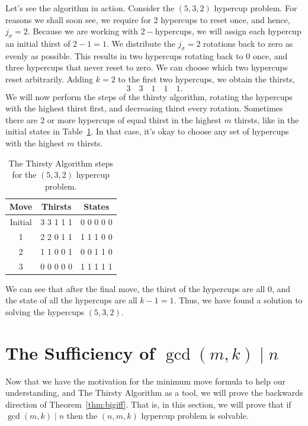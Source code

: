 \documentclass{article}
\theoremstyle{theorem}
\theoremstyle{definition}
\begin{document}
Let's see the algorithm in action. Consider the $(5,3,2)$ hypercup problem. For reasons we shall soon see, we require for 2 hypercups to reset once, and hence, $j_\sigma=2$. Because we are working with $2-$hypercups, we will assign each hypercup an initial thirst of $2-1=1.$ We distribute the $j_\sigma=2$ rotations back to zero as evenly as possible. This results in two hypercups rotating back to $0$ once, and three hypercups that never reset to zero. We can choose which two hypercups reset arbitrarily. Adding $k=2$ to the first two hypercups, we obtain the thirsts,
\begin{equation*}
    3 \quad 3\quad 1\quad 1\quad 1.
\end{equation*}
We will now perform the steps of the thirsty algorithm, rotating the hypercups with the highest thirst first, and decreasing thirst every rotation. Sometimes there are 2 or more hypercups of equal thirst in the highest $m$ thirsts, like in the initial states in Table~\ref{tab:thirstyalg}. In that case, it's okay to choose any set of hypercups with the highest $m$ thirsts.
\begin{table}[ht]
\centering
\begin{tabular}{c|cc}
\textbf{Move} & \textbf{Thirsts} & \textbf{States} \\
\hline
Initial & 3 3 1 1 1 & 0 0 0 0 0 \\
1 & 2 2 0 1 1 & 1 1 1 0 0 \\
2 & 1 1 0 0 1 & 0 0 1 1 0 \\
3 & 0 0 0 0 0 & 1 1 1 1 1 \\
\end{tabular}
\caption{The Thirsty Algorithm steps for the $(5,3,2)$ hypercup problem.}
\label{tab:thirstyalg}
\end{table}

We can see that after the final move, the thirst of the hypercups are all 0, and the state of all the hypercups are all $k-1=1.$ Thus, we have found a solution to solving the hypercups $(5,3,2)$.


\section*{The Sufficiency of $\gcd(m,k)\mid n$}\label{sec:backwards}

Now that we have the motivation for the minimum move formula to help our understanding, and The Thirsty Algorithm as a tool, we will prove the backwards direction of Theorem~\ref{thm:bigiff}. That is, in this section, we will prove that if $\gcd(m,k)\mid n$ then the $(n,m,k)$ hypercup problem is solvable. 
\end{document}
